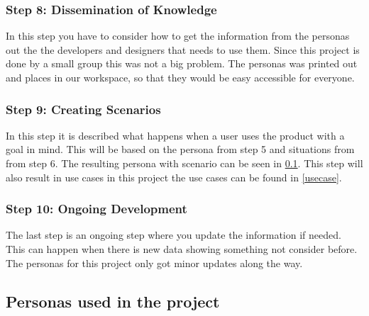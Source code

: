 \subsubsection{Step 8: Dissemination of Knowledge}
In this step you have to consider how to get the information from the personas out the the developers and designers that needs to use them. Since this project is done by a small group this was not a big problem. The personas was printed out and places in our workspace, so that they would be easy accessible for everyone.

\subsubsection{Step 9: Creating Scenarios}
In this step it is described what happens when a user uses the product with a goal in mind. This will be based on the persona from step 5 and situations from from step 6. The resulting persona with scenario can be seen in \cref{akkpersona}. This step will also result in use cases in this project the use cases can be found in \cref{usecase}.

\subsubsection{Step 10: Ongoing Development}
The last step is an ongoing step where you update the information if needed. This can happen when there is new data showing something not consider before. The personas for this project only got minor updates along the way.

\subsection{Personas used in the project}\label{akkpersona}

